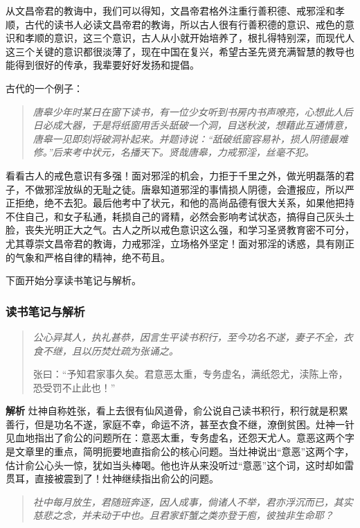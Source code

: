 从文昌帝君的教诲中，我们可以得知，文昌帝君格外注重行善积德、戒邪淫和孝顺，古代的读书人必读文昌帝君的教诲，所以古人很有行善积德的意识、戒色的意识和孝顺的意识，这三个意识，古人从小就开始培养了，根扎得特别深，而现代人这三个关键的意识都很淡薄了，现在中国在复兴，希望古圣先贤充满智慧的教导也能得到很好的传承，我辈要好好发扬和提倡。

古代的一个例子：

\begin{quote}\it
    唐皋少年时某日在窗下读书，有一位少女听到书房内书声嘹亮，心想此人后日必成大器，于是将纸窗用舌头舐破一个洞，目送秋波，想藉此互通情意，唐皋一见即刻将破洞补起来。并题诗说：“舐破纸窗容易补，损人阴德最难修。”后来考中状元，名播天下。贤哉唐皋，力戒邪淫，丝毫不犯。
\end{quote}

看看古人的戒色意识有多强！面对邪淫的机会，力拒于千里之外，做光明磊落的君子，不做邪淫放纵的无耻之徒。唐皋知道邪淫的事情损人阴德，会遭报应，所以严正拒绝，绝不去犯。最后他考中了状元，和他的高尚品德有很大关系，如果他把持不住自己，和女子私通，耗损自己的肾精，必然会影响考试状态，搞得自己灰头土脸，丧失光明正大之气。古人之所以戒色意识这么强，和学习圣贤教育密不可分，尤其尊崇文昌帝君的教诲，力戒邪淫，立场格外坚定！面对邪淫的诱惑，具有刚正的气象和严格自律的精神，绝不苟且。

下面开始分享读书笔记与解析。

\subsubsection*{读书笔记与解析}

\begin{quotation}\it
    公心异其人，执礼甚恭，因言生平读书积行，至今功名不遂，妻子不全，衣食不继，且以历焚灶疏为张诵之。

    张曰：“予知君家事久矣。君意恶太重，专务虚名，满纸怨尤，渎陈上帝，恐受罚不止此也！”
\end{quotation}

\textbf{解析} 灶神自称姓张，看上去很有仙风道骨，俞公说自己读书积行，积行就是积累善行，但是功名不遂，家庭不幸，命运不济，甚至衣食不继，潦倒贫困。灶神一针见血地指出了俞公的问题所在：意恶太重，专务虚名，还怨天尤人。意恶这两个字是文章里的重点，简明扼要地直指俞公的核心问题。当灶神说出“意恶”这两个字，估计俞公心头一惊，犹如当头棒喝。他也许从来没听过“意恶”这个词，这时却如雷贯耳，直接被震到了！灶神继续指出俞公的问题。

\begin{quote}\it
    社中每月放生，君随班奔逐，因人成事，倘诸人不举，君亦浮沉而已，其实慈悲之念，并未动于中也。且君家虾蟹之类亦登于庖，彼独非生命耶？
\end{quote}

